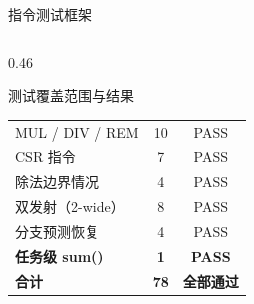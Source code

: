 \documentclass[aspectratio=169,xcolor={dvipsnames,svgnames},10pt]{beamer}
\newcommand{\gcheck}{\textcolor{AccentGreen}{\textbf{\checkmark}}}
\begin{document}
\begin{frame}[shrink=8]{指令测试框架}
\begin{columns}[T]
\begin{column}{0.46\textwidth}
\begin{block}{测试覆盖范围与结果}
\begin{tabular}{lcc}
          MUL / DIV / REM       & 10 & PASS \\
          CSR 指令              & 7  & PASS \\
          除法边界情况          & 4  & PASS \\
          双发射（2-wide）      & 8  & PASS \\
          分支预测恢复          & 4  & PASS \\
          \midrule
          \textbf{任务级 sum()} & \textbf{1} & \gcheck \textbf{PASS}\\
          \midrule
          \textbf{合计}         & \textbf{78} & \textbf{全部通过} \\
          \bottomrule
        \end{tabular}
      \end{block}
    \end{column}
  \end{columns}
\end{frame}
\end{document}
